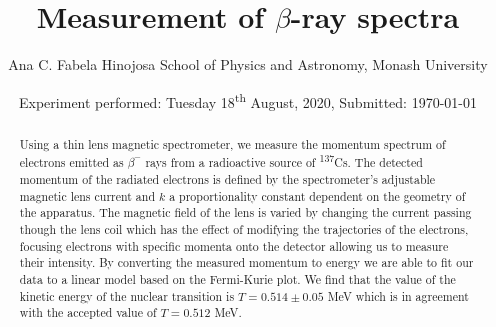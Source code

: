\documentclass[9pt, a4paper]{article}
\title{Measurement of $\beta$-ray spectra}
\author{Ana C. Fabela Hinojosa
\small{School of Physics and Astronomy, Monash University}}
\date{Experiment performed: Tuesday 18\textsuperscript{th} August, 2020,  Submitted: \today}
\begin{document}
\maketitle
\begin{abstract}
Using a thin lens magnetic spectrometer, we measure the momentum spectrum of electrons emitted as $\beta^{-}$ rays from a radioactive source of \textsuperscript{137}Cs. 
The detected momentum of the radiated electrons is defined by the spectrometer's adjustable magnetic lens current and $k$ a proportionality constant dependent on the geometry of the apparatus. The magnetic field of the lens is varied by changing the current passing though the lens coil which has the effect of modifying the trajectories of the electrons, focusing electrons with specific momenta onto the detector allowing us to measure their intensity. By converting the measured momentum to energy we are able to fit our data to a linear model based on the Fermi-Kurie plot. We find that the value of the kinetic energy of the nuclear transition is $T = 0.514 \pm 0.05$ MeV which is in agreement with the accepted value of $T = 0.512$ MeV\cite{SPA}.
\end{abstract}
\end{document}

